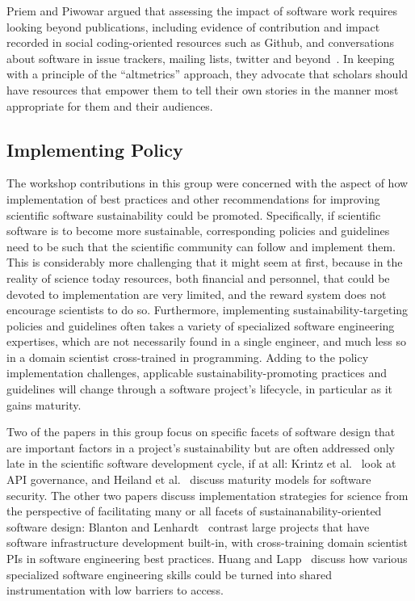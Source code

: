 \documentclass[11pt, oneside]{amsart}
\begin{document}
Priem and Piwowar argued that assessing the impact of software work
requires looking beyond publications, including evidence of contribution and impact recorded in social
coding-oriented resources such as Github, and conversations about software
in issue trackers, mailing lists, twitter and
beyond~\cite{Priem_WSSSPE}. In keeping with a principle of
the ``altmetrics'' approach, they advocate that scholars should have
resources that empower them to tell their own stories in the
manner most appropriate for them and their audiences.

\subsection{Implementing Policy}

The workshop contributions in this group were concerned with the
aspect of how implementation of best practices and other
recommendations for improving scientific software sustainability could
be promoted. Specifically, if scientific software is to become more
sustainable, corresponding policies and guidelines need to be such
that the scientific community can follow and implement them. This is
considerably more challenging that it might seem at first, because in
the reality of science today resources, both financial and personnel,
that could be devoted to implementation are very limited, and the
reward system does not encourage scientists to do so. Furthermore,
implementing sustainability-targeting policies and guidelines often
takes a variety of specialized software engineering expertises, which
are not necessarily found in a single engineer, and much less so in a
domain scientist cross-trained in programming. Adding to the policy
implementation challenges, applicable sustainability-promoting
practices and guidelines will change through a software project's
lifecycle, in particular as it gains maturity.

Two of the papers in this group focus on specific facets of software
design that are important factors in a project's sustainability but
are often addressed only late in the scientific software development
cycle, if at all: Krintz et al.~\cite{Krintz_WSSSPE} look at API
governance, and Heiland et al.~\cite{Heiland_WSSSPE} discuss maturity
models for software security. The other two papers discuss
implementation strategies for science from the perspective of
facilitating many or all facets of sustainanability-oriented software
design: Blanton and Lenhardt~\cite{Blanton_WSSSPE} contrast
large projects that have software infrastructure development built-in,
with cross-training domain scientist PIs in software engineering best
practices. Huang and Lapp~\cite{Huang_WSSSPE} discuss how various
specialized software engineering skills could be turned into shared
instrumentation with low barriers to access.
\end{document}
